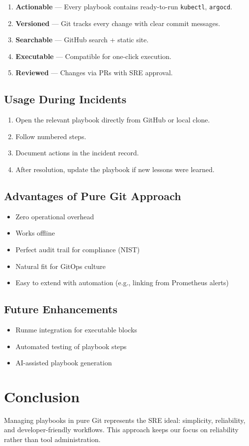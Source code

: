 \documentclass{article}
\begin{document}
\begin{enumerate}
    \item \textbf{Actionable} — Every playbook contains ready-to-run \texttt{kubectl}, \texttt{argocd}.
    \item \textbf{Versioned} — Git tracks every change with clear commit messages.
    \item \textbf{Searchable} — GitHub search + static site.
    \item \textbf{Executable} — Compatible for one-click execution.
    \item \textbf{Reviewed} — Changes via PRs with SRE approval.
\end{enumerate}

\subsection{Usage During Incidents}

\begin{enumerate}
    \item Open the relevant playbook directly from GitHub or local clone.
    \item Follow numbered steps.
    \item Document actions in the incident record.
    \item After resolution, update the playbook if new lessons were learned.
\end{enumerate}

\subsection{Advantages of Pure Git Approach}

\begin{itemize}
    \item Zero operational overhead
    \item Works offline
    \item Perfect audit trail for compliance (NIST)
    \item Natural fit for GitOps culture
    \item Easy to extend with automation (e.g., linking from Prometheus alerts)
\end{itemize}

\subsection{Future Enhancements}

\begin{itemize}
    \item Runme integration for executable blocks
    \item Automated testing of playbook steps
    \item AI-assisted playbook generation
\end{itemize}

\section{Conclusion}

Managing playbooks in pure Git represents the SRE ideal: simplicity, reliability,
and developer-friendly workflows. This approach keeps our focus on reliability rather than tool administration.
\end{document}
